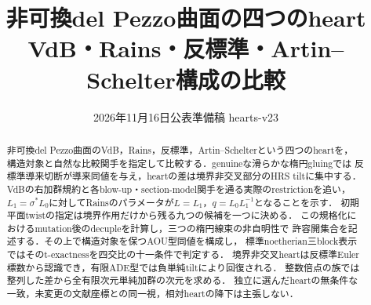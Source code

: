 \documentclass[11pt,a4paper]{ltjsarticle}
\title{非可換del Pezzo曲面の四つのheart\\
\large VdB・Rains・反標準・Artin--Schelter構成の比較}
\author{}
\date{2026年11月16日\qquad 公表準備稿 hearts-v23}
\theoremstyle{definition}
\begin{document}
\maketitle
\begin{abstract}
非可換del Pezzo曲面のVdB，Rains，反標準，Artin--Schelterという四つのheartを，
構造対象と自然な比較関手を指定して比較する．genuineな滑らかな楕円gluingでは
反標準導来切断が導来同値を与え，heartの差は境界非交叉部分のHRS tiltに集中する．
VdBの右加群規約と各blow-up・section-model関手を通る実際のrestrictionを追い，
$L_1=\sigma^*L_0$に対してRainsのパラメータが$L=L_1$，$q=L_0L_1^{-1}$となることを示す．
初期平面twistの指定は境界作用だけから残る九つの候補を一つに決める．
この規格化におけるmutation後のdecupleを計算し，三つの楕円線束の非自明性で
許容開集合を記述する．その上で構造対象を保つAOU型同値を構成し，
標準noetherian三block表示ではそのt-exactnessを四交比の十一条件で判定する．
境界非交叉heartは反標準Euler標数から認識でき，有限ADE型では負単純tiltにより回復される．
整数倍点の族では整列した差から全有限次元単純加群の次元を求める．
独立に選んだheartの無条件な一致，未変更の文献座標との同一視，相対heartの降下は主張しない．
\end{abstract}
\tableofcontents








\end{document}
